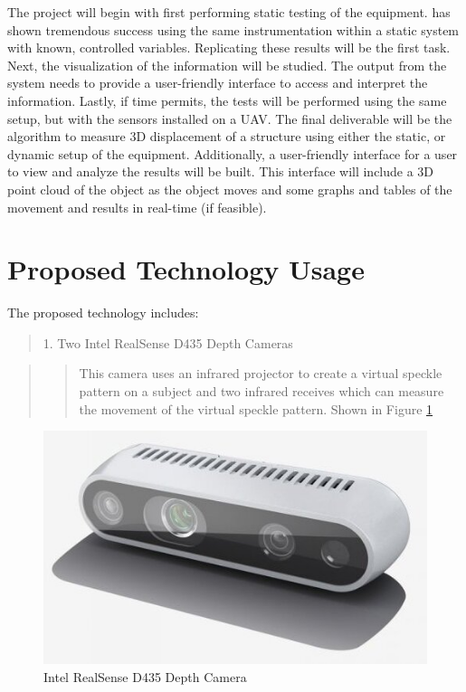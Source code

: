 \documentclass{sigchi}
\begin{document}
The project will begin with first performing static testing of the equipment. \cite{Nguyen2017} has shown tremendous success using the same instrumentation within a static system with known, controlled variables. Replicating these results will be the first task. Next, the visualization of the information will be studied. The output from the system needs to provide a user-friendly interface to access and interpret the information. Lastly, if time permits, the tests will be performed using the same setup, but with the sensors installed on a UAV. The final deliverable will be the algorithm to measure 3D displacement of a structure using either the static, or dynamic setup of the equipment. Additionally, a user-friendly interface for a user to view and analyze the results will be built. This interface will include a 3D point cloud of the object as the object moves and some graphs and tables of the movement and results in real-time (if feasible).

\section{Proposed Technology Usage}
The proposed technology includes:

\begin{quote}
    1. Two Intel RealSense D435 Depth Cameras
\end{quote} 

\begin{quote}
    \begin{quote}
       This camera uses an infrared projector to create a virtual speckle pattern on a subject and two infrared receives which can measure the movement of the virtual speckle pattern. Shown in Figure \ref{fig:1} 
    \end{quote}
\end{quote} 

\begin{figure}
\centering
    \includegraphics[width=0.9\columnwidth]{Figures/Intel_RealSense_D435.jpg}
    \caption{Intel RealSense D435 Depth Camera}
    \label{fig:1}
\end{figure}
\end{document}
